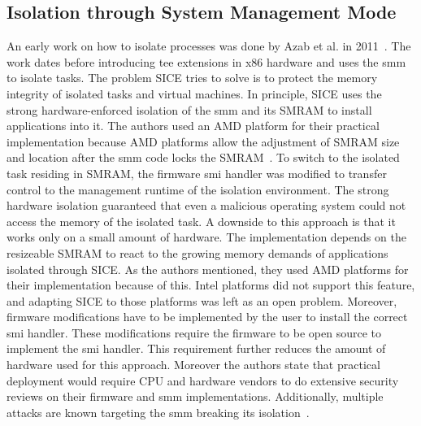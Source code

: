 \subsection{Isolation through System Management Mode}
\label{sec:20:isolation_smm}
An early work on how to isolate processes was done by Azab et al. in
2011~\cite{azab_sice_2011}. The work dates before introducing \gls{tee}
extensions in x86 hardware and uses the \gls{smm} to isolate tasks. The problem
SICE tries to solve is to protect the memory integrity of isolated tasks and
virtual machines. In principle, SICE uses the strong hardware-enforced isolation
of the \gls{smm} and its SMRAM to install applications into it. The authors used
an AMD platform for their practical implementation because AMD platforms allow
the adjustment of SMRAM size and location after the \gls{smm} code locks the
SMRAM~\cite{bios2014amd}. To switch to the isolated task residing in SMRAM, the
firmware \gls{smi} handler was modified to transfer control to the management
runtime of the isolation environment. The strong hardware isolation guaranteed
that even a malicious operating system could not access the memory of the
isolated task. A downside to this approach is that it works only on a small
amount of hardware. The implementation depends on the resizeable SMRAM to react
to the growing memory demands of applications isolated through SICE. As the
authors mentioned, they used AMD platforms for their implementation because of
this. Intel platforms did not support this feature, and adapting SICE to those
platforms was left as an open problem. Moreover, firmware modifications have to
be implemented by the user to install the correct \gls{smi} handler. These
modifications require the firmware to be open source to implement the \gls{smi}
handler. This requirement further reduces the amount of hardware used for this
approach. Moreover the authors state that practical deployment would require CPU
and hardware vendors to do extensive security reviews on their firmware and
\gls{smm} implementations. Additionally, multiple attacks are known targeting
the \gls{smm} breaking its isolation~\cite{wojtczuk2014attacking,
wojtczuk2009attacking, wojtczuk2009poisining}.

